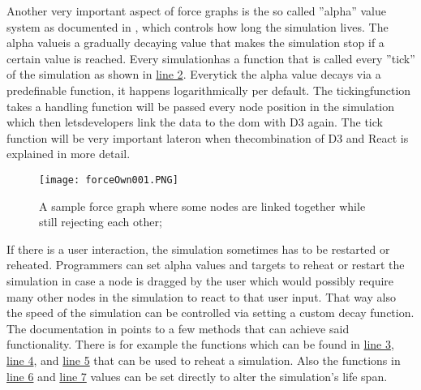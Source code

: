 Another very important aspect of force graphs is the so called ''alpha'' value system as documented in \cite[/d3-force/blob/master/README.md]{D3Github}, which controls how long the simulation lives. The alpha valueis a gradually decaying value that makes the simulation stop if a certain value is reached. Every simulationhas a function that is called every ''tick'' of the simulation as shown in \hyperref[prog:simulation]{line 2}. Everytick the alpha value decays via a predefinable function, it happens logarithmically per default. The tickingfunction takes a handling function will be passed every node position in the simulation which then letsdevelopers link the data to the dom with D3 again. The tick function will be very important lateron when thecombination of D3 and React is explained in more detail.

\begin{figure}
  \centering
  \texttt{[image: forceOwn001.PNG]}
  \caption{A sample force graph where some nodes are linked together while still rejecting each other;}
  \label{fig:force005}
\end{figure}

If there is a user interaction, the simulation sometimes has to be restarted or reheated. Programmers can set alpha values and targets to reheat or restart the simulation in case a node is dragged by the user which would possibly require many other nodes in the simulation to react to that user input. That way also the speed of the simulation can be controlled via setting a custom decay function. The documentation in \cite[/d3-force/blob/master/README.md]{D3Github} points to a few methods that can achieve said functionality. There is for example the functions which can be found in \hyperref[prog:simulation]{line 3}, \hyperref[prog:simulation]{line 4}, and \hyperref[prog:simulation]{line 5} that can be used to reheat a simulation. Also the functions in \hyperref[prog:simulation]{line 6} and \hyperref[prog:simulation]{line 7} values can be set directly to alter the simulation's life span.




